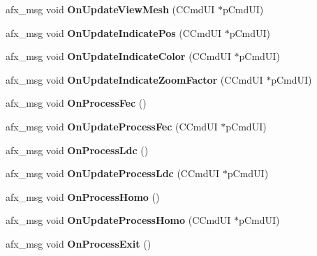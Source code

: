 \begin{DoxyCompactItemize}
afx\+\_\+msg void {\bfseries On\+Update\+View\+Mesh} (C\+Cmd\+UI $\ast$p\+Cmd\+UI)
\item 
\mbox{\label{class_work_view_ab1f8dafc5e94041874cab2efe9b1647a}} 
afx\+\_\+msg void {\bfseries On\+Update\+Indicate\+Pos} (C\+Cmd\+UI $\ast$p\+Cmd\+UI)
\item 
\mbox{\label{class_work_view_a02ab5b22f1df54d47048a3132a6be0eb}} 
afx\+\_\+msg void {\bfseries On\+Update\+Indicate\+Color} (C\+Cmd\+UI $\ast$p\+Cmd\+UI)
\item 
\mbox{\label{class_work_view_a7532947de83575c7930d2030245927be}} 
afx\+\_\+msg void {\bfseries On\+Update\+Indicate\+Zoom\+Factor} (C\+Cmd\+UI $\ast$p\+Cmd\+UI)
\item 
\mbox{\label{class_work_view_a3b5e67652e2a38805d1f7733845b438c}} 
afx\+\_\+msg void {\bfseries On\+Process\+Fec} ()
\item 
\mbox{\label{class_work_view_a9dbcece36f66807285bcda9d74e18768}} 
afx\+\_\+msg void {\bfseries On\+Update\+Process\+Fec} (C\+Cmd\+UI $\ast$p\+Cmd\+UI)
\item 
\mbox{\label{class_work_view_a2e21dab769506c6cbd2226c0e3afda3b}} 
afx\+\_\+msg void {\bfseries On\+Process\+Ldc} ()
\item 
\mbox{\label{class_work_view_afad796ba220493bff71a108948454d1b}} 
afx\+\_\+msg void {\bfseries On\+Update\+Process\+Ldc} (C\+Cmd\+UI $\ast$p\+Cmd\+UI)
\item 
\mbox{\label{class_work_view_a471b522ecb40aa8c9387faeca6955a5e}} 
afx\+\_\+msg void {\bfseries On\+Process\+Homo} ()
\item 
\mbox{\label{class_work_view_aac95c904a9d4d6592b0aa8ffd7205545}} 
afx\+\_\+msg void {\bfseries On\+Update\+Process\+Homo} (C\+Cmd\+UI $\ast$p\+Cmd\+UI)
\item 
\mbox{\label{class_work_view_a3792019ca2113e37d5f890d73083e9a6}} 
afx\+\_\+msg void {\bfseries On\+Process\+Exit} ()
\item 

\end{DoxyCompactItemize}
